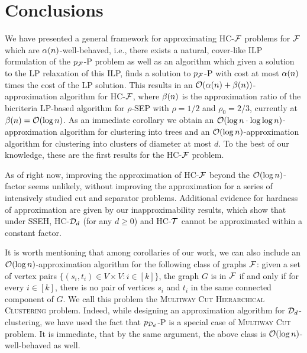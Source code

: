 \section{Conclusions}

We have presented a general framework for approximating \textsc{HC-$\mathcal{F}$} problems for $\mathcal{F}$ which are $\alpha\mathopen{}\left( n \right)$-well-behaved, i.e., there exists a natural, cover-like ILP formulation of the \textsc{$p_{\mathcal{F}}$-P} problem as well as an algorithm which given a solution to the LP relaxation of this ILP, finds a solution to \textsc{$p_{\mathcal{F}}$-P} with cost at most $\alpha\mathopen{}\left( n \right)$ times the cost of the LP solution. This results in an $\mathcal{O}\mathopen{}\left( \alpha\mathopen{}\left( n \right)+\beta\mathopen{}\left( n \right) \right)$-approximation algorithm for \textsc{HC-$\mathcal{F}$}, where $\beta\mathopen{}\left( n \right)$ is the approximation ratio of the bicriteria LP-based algorithm for \textsc{$\rho$-SEP} with $\rho=1/2$ and $\rho_0=2/3$, currently at $\beta\mathopen{}\left( n \right)=\mathcal{O}\mathopen{}\left( \log n \right)$. As an immediate corollary we obtain an $\mathcal{O}\mathopen{}\left( \log n\cdot\log\log n \right)$-approximation algorithm for clustering into trees and an $\mathcal{O}\mathopen{}\left( \log n \right)$-approximation algorithm for clustering into clusters of diameter at most $d$. To the best of our knowledge, these are the first results for the \textsc{HC-$\mathcal{F}$} problem.

As of right now, improving the approximation of \textsc{HC-$\mathcal{F}$} beyond the $\mathcal{O}\mathopen{}\left( \log n \right)$-factor seems unlikely, without improving the approximation for a series of intensively studied cut and separator problems. Additional evidence for hardness of approximation are given by our inapproximability results, which show that under \textsc{SSEH}, \textsc{HC-$\mathcal{D}_d$} (for any $d\geq 0$) and \textsc{HC-$\mathcal{T}$} cannot be approximated within a constant factor.

It is worth mentioning that among corollaries of our work, we can also include an $\mathcal{O}\mathopen{}\left( \log n \right)$-approximation algorithm for the following class of graphs $\mathcal{F}$: given a set of vertex pairs $\{(s_i, t_i)\in V\times V\colon i\in [k]\}$, the graph $G$ is in $\mathcal{F}$ if and only if for every $i\in [k]$, there is no pair of vertices $s_i$ and $t_i$ in the same connected component of $G$. We call this problem the \textsc{Multiway Cut Hierarchical Clustering} problem. Indeed, while designing an approximation algorithm for $\mathcal{D}_d$-clustering, we have used the fact that $p_{\mathcal{D}_d}$-P is a special case of \textsc{Multiway Cut} problem. It is immediate, that by the same argument, the above class is $\mathcal{O}\mathopen{}\left( \log n \right)$-well-behaved as well.
